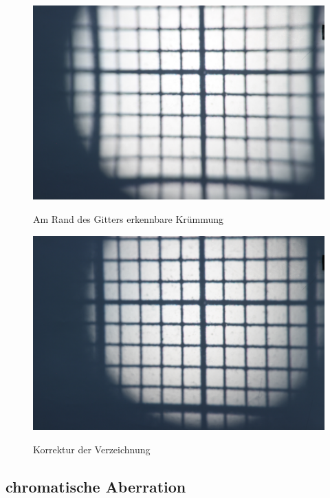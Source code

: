 \begin{figure}[htb]
	\begin{minipage}[t]{0.48\textwidth}
		\includegraphics[width=\linewidth]{img/Verzeichnung/Prakt_Linsenfehler_2015_06_04_082}
		\label{fig:verzeichnung}
		\caption{Am Rand des Gitters erkennbare Krümmung}
	\end{minipage}
	\hfill
	\begin{minipage}[t]{0.48\textwidth}
		\includegraphics[width=\linewidth]{img/Verzeichnung/Prakt_Linsenfehler_2015_06_04_083}
		\label{fig:verzeichnung_korrigiert}
		\caption{Korrektur der Verzeichnung}
	\end{minipage}
\end{figure}

\subsection{chromatische Aberration}